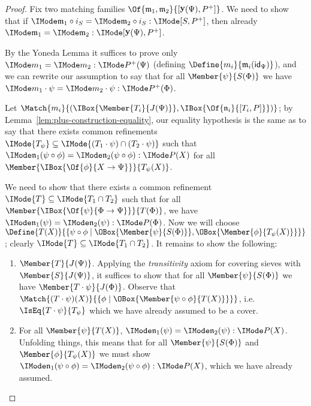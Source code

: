 \documentclass{article}
\DeclareMathOperator\OpYoneda{\mathbf{y}}
\newcommand\Yoneda[1]{\OpYoneda({#1})}
\newcommand\IsSubsetEq[2]{\IMode{#1}\subseteq\IMode{#2}}
\newcommand\ArrId[1]{\mathsf{id}_{#1}}
\begin{document}
\begin{proof}
  Fix two matching families
  $\Of{\mathfrak{m}_1,\mathfrak{m}_2}{[\Yoneda{\Psi},\Plus{P}]}$. We
  need to show that if
  $\IsEqOf{\mathfrak{m}_1\circ i_S}{\mathfrak{m}_2\circ
    i_S}{[S,\Plus{P}]}$, then already
  $\IsEqOf{\mathfrak{m}_1}{\mathfrak{m}_2}{[\Yoneda{\Psi},\Plus{P}]}$.
  
  By the Yoneda Lemma it suffices to prove only
  $\IsEqOf{m_1}{m_2}{\Plus{P}(\Psi)}$ (defining
  $\Define{m_i}{\mathfrak{m}_i(\ArrId{\Psi})}$), and we can rewrite
  our assumption to say that for all $\Member{\psi}{S(\Phi)}$ we have
  $\IsEqOf{m_1\cdot\psi}{m_2\cdot\psi}{\Plus{P}(\Phi)}$.

  Let
  $\Match{m_i}{(\IBox{\Member{T_i}{J(\Psi)}},\IBox{\Of{\mathfrak{n}_i}{[T_i,P]}})}$;
  by Lemma~\ref{lem:plus-construction-equality}, our equality
  hypothesis is the same as to say that there exists common
  refinements $\IsSubsetEq{T_\psi}{(T_1\cdot\psi)\cap (T_2\cdot\psi)}$
  such that
  $\IsEqOf{\mathfrak{n}_1(\psi\circ\phi)}{\mathfrak{n}_2(\psi\circ\phi)}{P(X)}$
  for all $\Member{\IBox{\Of{\phi}{X\to\Psi}}}{T_\psi(X)}$.

  We need to show that there exists a common refinement
  $\IsSubsetEq{T}{T_1\cap T_2}$ such that for all
  $\Member{\IBox{\Of{\psi}{\Phi\to\Psi}}}{T(\Phi)}$, we have
  $\IsEqOf{\mathfrak{n}_1(\psi)}{\mathfrak{n}_2(\psi)}{P(\Phi)}$. Now
  we will choose
  $\Define{T(X)}{\MkSet{\psi \circ \phi \mid
      \OBox{\Member{\psi}{S(\Phi)}}, \OBox{\Member{\phi}{T_\psi(X)}}}}$;
  clearly $\IsSubsetEq{T}{T_1\cap T_2}$. It remains to show the
  following:
  \begin{enumerate}
  \item $\Member{T}{J(\Psi)}$. Applying the \emph{transitivity} axiom
    for covering sieves with $\Member{S}{J(\Psi)}$, it suffices to
    show that for all $\Member{\psi}{S(\Phi)}$ we have
    $\Member{T\cdot\psi}{J(\Phi)}$. Observe that
    $\Match{(T\cdot\psi)(X)}{\MkSet{\phi\mid
        \OBox{\Member{\psi\circ\phi}{T(X)}}}}$, i.e.\
    $\IsEq{T\cdot\psi}{T_\psi}$ which we have already assumed to be a
    cover.

  \item For all $\Member{\psi}{T(X)}$,
    $\IsEqOf{\mathfrak{n}_1(\psi)}{\mathfrak{n}_2(\psi)}{P(X)}$. Unfolding
    things, this means that for all $\Member{\psi}{S(\Phi)}$ and
    $\Member{\phi}{T_\psi(X)}$ we must show
    $\IsEqOf{\mathfrak{n}_1(\psi\circ\phi)}{\mathfrak{n}_2(\psi\circ\phi)}{P(X)}$,
    which we have already assumed.
  \end{enumerate}

\end{proof}
\end{document}
